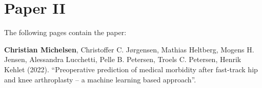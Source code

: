 \chapter{Paper II}
\label{chapter:hospital}

The following pages contain the paper:
\vspace*{1cm}


\textbf{Christian Michelsen}, Christoffer C. Jørgensen, Mathias Heltberg, Mogens H. Jensen, Alessandra Lucchetti, Pelle B. Petersen, Troels C. Petersen, Henrik Kehlet (2022). ``Preoperative prediction of medical morbidity after fast-track hip and knee arthroplasty -- a machine learning based approach''.


\clearpage
